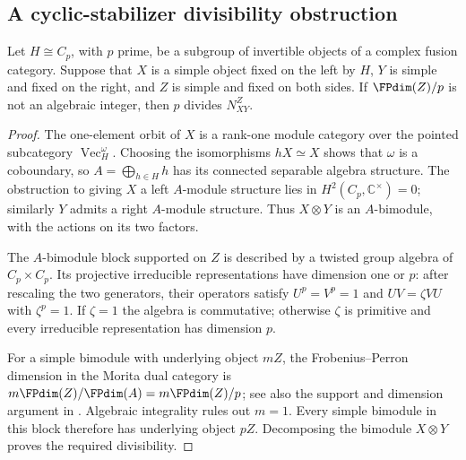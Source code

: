 \subsection{A cyclic-stabilizer divisibility obstruction}
\label{subsec:cyclic-module-divisibility}

\begin{proposition}\label{prop:cyclic-module-divisibility}
Let $H\cong C_p$, with $p$ prime, be a subgroup of invertible objects
of a complex fusion category. Suppose that $X$ is a simple object
fixed on the left by $H$, $Y$ is simple and fixed on the right, and
$Z$ is simple and fixed on both sides. If
$\FPdim(Z)/p$ is not an algebraic integer, then $p$ divides $N_{XY}^Z$.
\end{proposition}
\begin{proof}
The one-element orbit of $X$ is a rank-one module category over the
pointed subcategory $\operatorname{Vec}_H^\omega$. Choosing the
isomorphisms $hX\simeq X$ shows that $\omega$ is a coboundary, so
$A=\bigoplus_{h\in H}h$ has its connected separable algebra structure.
The obstruction to giving $X$ a left $A$-module structure lies in
$H^2(C_p,\mathbb C^\times)=0$; similarly $Y$ admits a right
$A$-module structure. Thus $X\otimes Y$ is an $A$-bimodule, with the
actions on its two factors.

The $A$-bimodule block supported on $Z$ is described by a twisted
group algebra of $C_p\times C_p$. Its projective irreducible
representations have dimension one or $p$: after rescaling the two
generators, their operators satisfy $U^p=V^p=1$ and
$UV=\zeta VU$ with $\zeta^p=1$. If $\zeta=1$ the algebra is
commutative; otherwise $\zeta$ is primitive and every irreducible
representation has dimension $p$.

For a simple bimodule with underlying object $mZ$, the
Frobenius--Perron dimension in the Morita dual category is
$m\FPdim(Z)/\FPdim(A)=m\FPdim(Z)/p$; see also the support and
dimension argument in \cite[Lemmas~6.1--6.2]{EGO}.
Algebraic integrality rules out $m=1$. Every simple bimodule in this
block therefore has underlying object $pZ$. Decomposing the
bimodule $X\otimes Y$ proves the required divisibility.
\end{proof}

